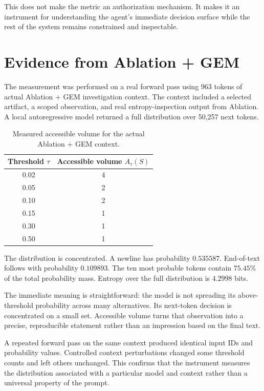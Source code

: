 \documentclass[11pt,a4paper]{article}
\begin{document}
This does not make the metric an authorization mechanism. It makes it an instrument for understanding the agent's immediate decision surface while the rest of the system remains constrained and inspectable.

\section{Evidence from Ablation + GEM}
The measurement was performed on a real forward pass using 963 tokens of actual Ablation + GEM investigation context. The context included a selected artifact, a scoped observation, and real entropy-inspection output from Ablation. A local autoregressive model returned a full distribution over 50,257 next tokens.

\begin{table}[h]
\centering
\caption{Measured accessible volume for the actual Ablation + GEM context.}
\label{tab:result}
\begin{tabular}{cc}
\toprule
Threshold $\tau$ & Accessible volume $A_\tau(S)$ \\
\midrule
0.02 & 4 \\
0.05 & 2 \\
0.10 & 2 \\
0.15 & 1 \\
0.30 & 1 \\
0.50 & 1 \\
\bottomrule
\end{tabular}
\end{table}

The distribution is concentrated. A newline has probability $0.535587$. End-of-text follows with probability $0.109893$. The ten most probable tokens contain $75.45\%$ of the total probability mass. Entropy over the full distribution is $4.2998$ bits.

The immediate meaning is straightforward: the model is not spreading its above-threshold probability across many alternatives. Its next-token decision is concentrated on a small set. Accessible volume turns that observation into a precise, reproducible statement rather than an impression based on the final text.

A repeated forward pass on the same context produced identical input IDs and probability values. Controlled context perturbations changed some threshold counts and left others unchanged. This confirms that the instrument measures the distribution associated with a particular model and context rather than a universal property of the prompt.
\end{document}
